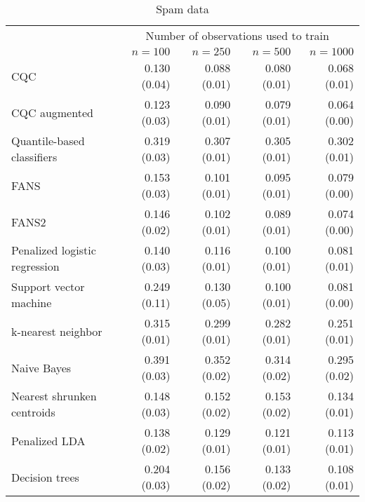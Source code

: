 
\begin{table}
  \caption{Spam data}
  \label{tab:spam}
  \centering
  \vspace{5mm}

  \begin{adjustbox}{max size={\textwidth}{10cm}}
    \begin{tabular}{l@{\extracolsep{15mm}}rrrr}
      \toprule
      & \multicolumn{4}{c}{Number of observations used to train} \\[1ex]
      \cline{2-5}
      \rule{0mm}{5mm} & $n = 100$ & $n = 250$ & $n = 500$ & $n = 1000$ \\
      \midrule
      CQC & 0.130 (0.04) & 0.088 (0.01) & 0.080 (0.01) & 0.068 (0.01) \\ 
      CQC augmented & 0.123 (0.03) & 0.090 (0.01) & 0.079 (0.01) & 0.064 (0.00) \\ 
      Quantile-based classifiers & 0.319 (0.03) & 0.307 (0.01) & 0.305 (0.01) & 0.302 (0.01) \\ 
      FANS & 0.153 (0.03) & 0.101 (0.01) & 0.095 (0.01) & 0.079 (0.00) \\ 
      FANS2 & 0.146 (0.02) & 0.102 (0.01) & 0.089 (0.01) & 0.074 (0.00) \\ 
      Penalized logistic regression & 0.140 (0.03) & 0.116 (0.01) & 0.100 (0.01) & 0.081 (0.01) \\ 
      Support vector machine & 0.249 (0.11) & 0.130 (0.05) & 0.100 (0.01) & 0.081 (0.00) \\ 
      k-nearest neighbor & 0.315 (0.01) & 0.299 (0.01) & 0.282 (0.01) & 0.251 (0.01) \\ 
      Naive Bayes & 0.391 (0.03) & 0.352 (0.02) & 0.314 (0.02) & 0.295 (0.02) \\ 
      Nearest shrunken centroids & 0.148 (0.03) & 0.152 (0.02) & 0.153 (0.02) & 0.134 (0.01) \\ 
      Penalized LDA & 0.138 (0.02) & 0.129 (0.01) & 0.121 (0.01) & 0.113 (0.01) \\ 
      Decision trees & 0.204 (0.03) & 0.156 (0.02) & 0.133 (0.02) & 0.108 (0.01) \\ 
      \bottomrule
    \end{tabular}
  \end{adjustbox}
\end{table}




